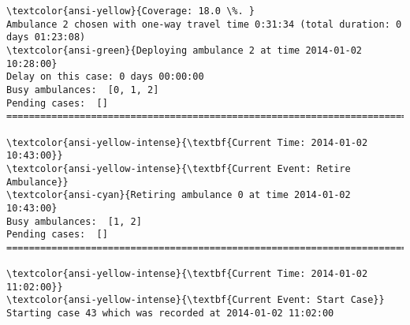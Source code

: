 \documentclass[11pt]{article}
\begin{document}
    \begin{Verbatim}[commandchars=\\\{\}]
\textcolor{ansi-yellow}{Coverage: 18.0 \%. }
Ambulance 2 chosen with one-way travel time 0:31:34 (total duration: 0 days 01:23:08)
\textcolor{ansi-green}{Deploying ambulance 2 at time 2014-01-02 10:28:00}
Delay on this case: 0 days 00:00:00
Busy ambulances:  [0, 1, 2]
Pending cases:  []
========================================================================

\textcolor{ansi-yellow-intense}{\textbf{Current Time: 2014-01-02 10:43:00}}
\textcolor{ansi-yellow-intense}{\textbf{Current Event: Retire Ambulance}}
\textcolor{ansi-cyan}{Retiring ambulance 0 at time 2014-01-02 10:43:00}
Busy ambulances:  [1, 2]
Pending cases:  []
========================================================================

\textcolor{ansi-yellow-intense}{\textbf{Current Time: 2014-01-02 11:02:00}}
\textcolor{ansi-yellow-intense}{\textbf{Current Event: Start Case}}
Starting case 43 which was recorded at 2014-01-02 11:02:00

    \end{Verbatim}

    \begin{center}
    \end{center}
    { \hspace*{\fill} \\}
    
\end{document}
